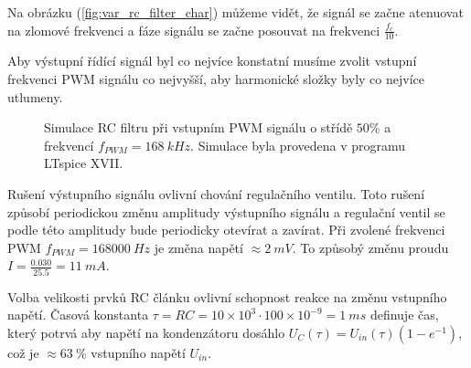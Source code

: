 Na obrázku (\ref{fig:var_rc_filter_char}) můžeme vidět, že signál se začne atenuovat na zlomové frekvenci a fáze signálu se začne posouvat na frekvenci $\frac{f_c}{10}$.  \par

Aby výstupní řídící signál byl co nejvíce konstatní musíme zvolit vstupní frekvenci PWM signálu co nejvyšší, aby harmonické složky byly co nejvíce utlumeny.

\begin{figure}[H]
    \caption{Simulace RC filtru při vstupním PWM signálu o střídě $50\%$ a frekvencí $f_{PWM} = 168 \ kHz $. Simulace byla provedena v programu LTspice XVII.}
    \label{fig:filtered_pwm}
\end{figure}


Rušení výstupního signálu ovlivní chování regulačního ventilu. Toto rušení způsobí periodickou změnu amplitudy výstupního signálu a regulační ventil se podle této amplitudy bude periodicky otevírat a zavírat. Při zvolené frekvenci PWM $f_{PWM} = 168000 \ Hz $ je změna napětí $\approx 2 \ mV$. To způsobý změnu proudu $I = \frac{0.030}{25.5} = 11 \ mA $. \par
Volba velikosti prvků RC článku ovlivní schopnost reakce na změnu vstupního napětí.
Časová konstanta $\tau = RC = 10 \times 10^{3} \cdot 100 \times 10^{-9}= 1\ ms$ definuje čas, který potrvá aby napětí na kondenzátoru dosáhlo $U_{C}(\tau) = U_{in}(\tau)(1 - e^{-1})$, což je $\approx 63 \ \% $ vstupního napětí $U_{in}$.

